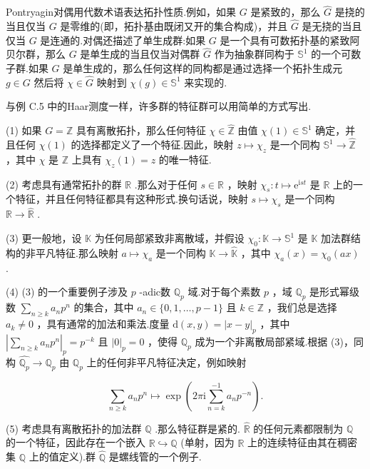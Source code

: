 \documentclass[lang=cn,a4paper,11pt,openany,scheme=chinese]{elegantbook}
\renewcommand{\geq}{\geqslant}
\begin{document}
Pontryagin对偶用代数术语表达拓扑性质.例如，如果 \(G\) 是紧致的，那么 \(\widehat{G}\) 是挠的当且仅当 \(G\) 是零维的(即，拓扑基由既闭又开的集合构成)，并且 \(\widehat{G}\) 是无挠的当且仅当 \(G\) 是连通的.对偶还描述了单生成群:如果 \(G\) 是一个具有可数拓扑基的紧致阿贝尔群，那么 \(G\) 是单生成的当且仅当对偶群 \(\widehat{G}\) 作为抽象群同构于 \({\mathbb{S}}^{1}\) 的一个可数子群.如果 \(G\) 是单生成的，那么任何这样的同构都是通过选择一个拓扑生成元 \(g \in  G\) 然后将 \(\chi  \in  \widehat{G}\) 映射到 \(\chi \left( g\right)  \in  {\mathbb{S}}^{1}\) 来实现的.

\setcounter{instance}{13}
\begin{instance}
    与例 C.5 中的Haar测度一样，许多群的特征群可以用简单的方式写出.

(1) 如果 \(G = \mathbb{Z}\) 具有离散拓扑，那么任何特征 \(\chi  \in  \widehat{\mathbb{Z}}\) 由值 \(\chi \left( 1\right)  \in  {\mathbb{S}}^{1}\) 确定，并且任何 \(\chi \left( 1\right)\) 的选择都定义了一个特征.因此，映射 \(z \mapsto  {\chi }_{z}\) 是一个同构 \({\mathbb{S}}^{1} \rightarrow  \widehat{\mathbb{Z}}\) ，其中 \(\chi\) 是 \(\mathbb{Z}\) 上具有 \({\chi }_{z}\left( 1\right)  = z\) 的唯一特征.

(2) 考虑具有通常拓扑的群 \(\mathbb{R}\) .那么对于任何 \(s \in  \mathbb{R}\) ，映射 \({\chi }_{s} : t \mapsto  {\mathrm{e}}^{\mathrm{i}{st}}\) 是 \(\mathbb{R}\) 上的一个特征，并且任何特征都具有这种形式.换句话说，映射 \(s \mapsto  {\chi }_{s}\) 是一个同构 \(\mathbb{R} \rightarrow  \widehat{\mathbb{R}}\) .

(3) 更一般地，设 \(\mathbb{K}\) 为任何局部紧致非离散域，并假设 \({\chi }_{0} : \mathbb{K} \rightarrow  {\mathbb{S}}^{1}\) 是 \(\mathbb{K}\) 加法群结构的非平凡特征.那么映射 \(a \mapsto  {\chi }_{a}\) 是一个同构 \(\mathbb{K} \rightarrow  \widehat{\mathbb{K}}\) ，其中 \({\chi }_{a}\left( x\right)  = {\chi }_{0}\left( {ax}\right)\) .

(4) (3) 的一个重要例子涉及 \(p\) -adic数 \({\mathbb{Q}}_{p}\) 域.对于每个素数 \(p\) ，域 \({\mathbb{Q}}_{p}\) 是形式幂级数 \(\mathop{\sum }\limits_{{n \geq  k}}{a}_{n}{p}^{n}\) 的集合，其中 \({a}_{n} \in  \{ 0,1,\ldots ,p - 1\}\) 且 \(k \in  \mathbb{Z}\) ，我们总是选择 \({a}_{k} \neq  0\) ，具有通常的加法和乘法.度量 \(\mathrm{d}\left( {x,y}\right)  = {\left| x - y\right| }_{p}\) ，其中 \({\left| \mathop{\sum }\limits_{{n \geq  k}}{a}_{n}{p}^{n}\right| }_{p} = {p}^{-k}\) 且 \({\left| 0\right| }_{p} = 0\) ，使得 \({\mathbb{Q}}_{p}\) 成为一个非离散局部紧域.根据 (3)，同构 \(\widehat{{\mathbb{Q}}_{p}} \rightarrow  {\mathbb{Q}}_{p}\) 由 \({\mathbb{Q}}_{p}\) 上的任何非平凡特征决定，例如映射

\[
\mathop{\sum }\limits_{{n \geq  k}}{a}_{n}{p}^{n} \mapsto  \exp \left( {{2\pi }\mathrm{i}\mathop{\sum }\limits_{{n = k}}^{{-1}}{a}_{n}{p}^{-n}}\right) .
\]

(5) 考虑具有离散拓扑的加法群 \(\mathbb{Q}\) .那么特征群是紧的. \(\widehat{\mathbb{R}}\) 的任何元素都限制为 \(\mathbb{Q}\) 的一个特征，因此存在一个嵌入 \(\mathbb{R} \hookrightarrow  \widehat{\mathbb{Q}}\) (单射，因为 \(\mathbb{R}\) 上的连续特征由其在稠密集 \(\mathbb{Q}\) 上的值定义).群 \(\widehat{\mathbb{Q}}\) 是螺线管的一个例子.
\end{instance}
\end{document}

